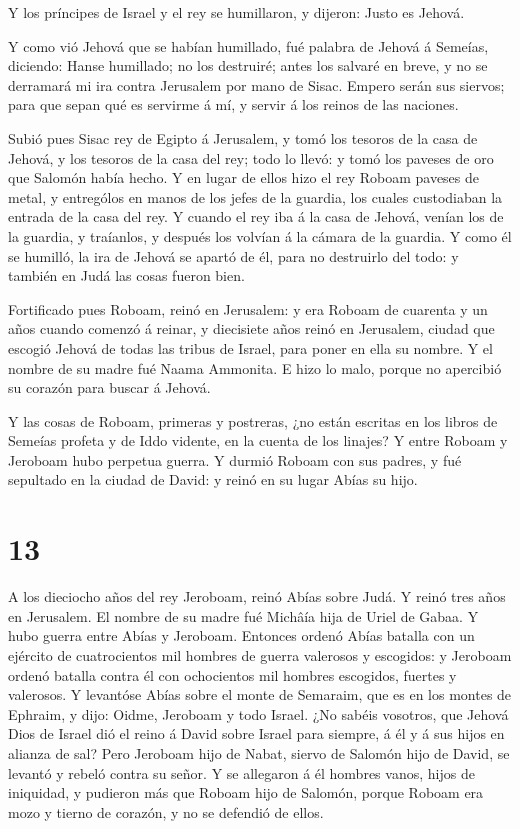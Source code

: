  Y los príncipes de Israel y el rey se humillaron, y
dijeron: Justo es Jehová.

 Y como vió Jehová que se habían humillado, fué palabra de
Jehová á Semeías, diciendo: Hanse humillado; no los destruiré; antes los
salvaré en breve, y no se derramará mi ira contra Jerusalem por mano de
Sisac.  Empero serán sus siervos; para que sepan qué es
servirme á mí, y servir á los reinos de las naciones.

 Subió pues Sisac rey de Egipto á Jerusalem, y tomó los
tesoros de la casa de Jehová, y los tesoros de la casa del rey; todo lo
llevó: y tomó los paveses de oro que Salomón había hecho. 
Y en lugar de ellos hizo el rey Roboam paveses de metal, y entrególos en
manos de los jefes de la guardia, los cuales custodiaban la entrada de
la casa del rey.  Y cuando el rey iba á la casa de Jehová,
venían los de la guardia, y traíanlos, y después los volvían á la cámara
de la guardia.  Y como él se humilló, la ira de Jehová se
apartó de él, para no destruirlo del todo: y también en Judá las cosas
fueron bien.

 Fortificado pues Roboam, reinó en Jerusalem: y era Roboam
de cuarenta y un años cuando comenzó á reinar, y diecisiete años reinó
en Jerusalem, ciudad que escogió Jehová de todas las tribus de Israel,
para poner en ella su nombre. Y el nombre de su madre fué Naama
Ammonita.  E hizo lo malo, porque no apercibió su corazón
para buscar á Jehová.

 Y las cosas de Roboam, primeras y postreras, ¿no están
escritas en los libros de Semeías profeta y de Iddo vidente, en la
cuenta de los linajes? Y entre Roboam y Jeroboam hubo perpetua guerra.
 Y durmió Roboam con sus padres, y fué sepultado en la
ciudad de David: y reinó en su lugar Abías su hijo.

\hypertarget{section-12}{%
\section{13}\label{section-12}}

 A los dieciocho años del rey Jeroboam, reinó Abías sobre
Judá.  Y reinó tres años en Jerusalem. El nombre de su madre
fué Michâía hija de Uriel de Gabaa. Y hubo guerra entre Abías y
Jeroboam.  Entonces ordenó Abías batalla con un ejército de
cuatrocientos mil hombres de guerra valerosos y escogidos: y Jeroboam
ordenó batalla contra él con ochocientos mil hombres escogidos, fuertes
y valerosos.  Y levantóse Abías sobre el monte de Semaraim,
que es en los montes de Ephraim, y dijo: Oidme, Jeroboam y todo Israel.
 ¿No sabéis vosotros, que Jehová Dios de Israel dió el reino
á David sobre Israel para siempre, á él y á sus hijos en alianza de sal?
 Pero Jeroboam hijo de Nabat, siervo de Salomón hijo de
David, se levantó y rebeló contra su señor.  Y se allegaron
á él hombres vanos, hijos de iniquidad, y pudieron más que Roboam hijo
de Salomón, porque Roboam era mozo y tierno de corazón, y no se defendió
de ellos.

